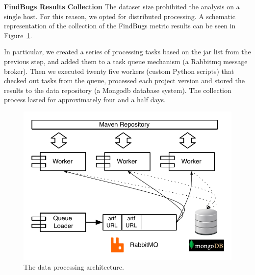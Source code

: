 \documentclass{sig-alternate}
\begin{document}


{\bf FindBugs Results Collection} The dataset
size prohibited the analysis
on a single host. For this reason,
we opted for distributed processing.
A schematic representation of the collection of
the FindBugs metric results can be seen in Figure~\ref{fig:arch}.


In particular, we created a series of processing tasks
based on the {\sc jar} list from the
previous step, and added them to a task queue mechanism (a
Rabbit{\sc mq} message broker). Then we executed twenty five
workers (custom Python scripts) that checked out tasks from
the queue, processed each project version and stored the
results to the data repository (a Mongo{\sc db} database system).
The collection process lasted for approximately four and
a half days.

\begin{figure}[h]
  \begin{center}
    \includegraphics[scale=0.73]{figures/arch.pdf}
  \end{center}
  \caption{The data processing architecture.}
  \label{fig:arch}
\end{figure}
\end{document}
